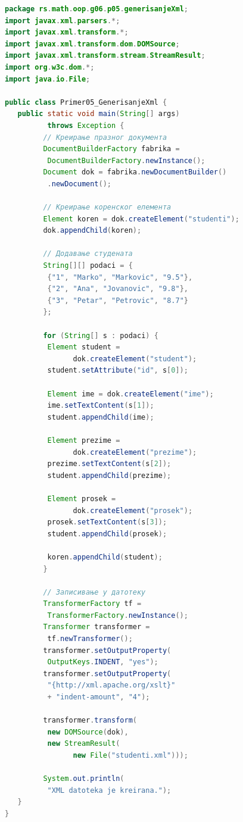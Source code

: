\begin{lstlisting}[language=Java]
package rs.math.oop.g06.p05.generisanjeXml;
import javax.xml.parsers.*;
import javax.xml.transform.*;
import javax.xml.transform.dom.DOMSource;
import javax.xml.transform.stream.StreamResult;
import org.w3c.dom.*;
import java.io.File;
 
public class Primer05_GenerisanjeXml {
   public static void main(String[] args)
          throws Exception {
         // Креирање празног документа
         DocumentBuilderFactory fabrika =
          DocumentBuilderFactory.newInstance();
         Document dok = fabrika.newDocumentBuilder()
          .newDocument();
 
         // Креирање коренског елемента
         Element koren = dok.createElement("studenti");
         dok.appendChild(koren);
 
         // Додавање студената
         String[][] podaci = {
          {"1", "Marko", "Markovic", "9.5"},
          {"2", "Ana", "Jovanovic", "9.8"},
          {"3", "Petar", "Petrovic", "8.7"}
         };
 
         for (String[] s : podaci) {
          Element student =
                dok.createElement("student");
          student.setAttribute("id", s[0]);
 
          Element ime = dok.createElement("ime");
          ime.setTextContent(s[1]);
          student.appendChild(ime);
 
          Element prezime =
                dok.createElement("prezime");
          prezime.setTextContent(s[2]);
          student.appendChild(prezime);
 
          Element prosek =
                dok.createElement("prosek");
          prosek.setTextContent(s[3]);
          student.appendChild(prosek);
 
          koren.appendChild(student);
         }
 
         // Записивање у датотеку
         TransformerFactory tf =
          TransformerFactory.newInstance();
         Transformer transformer =
          tf.newTransformer();
         transformer.setOutputProperty(
          OutputKeys.INDENT, "yes");
         transformer.setOutputProperty(
          "{http://xml.apache.org/xslt}"
          + "indent-amount", "4");
 
         transformer.transform(
          new DOMSource(dok),
          new StreamResult(
                new File("studenti.xml")));
 
         System.out.println(
          "XML datoteka je kreirana.");
   }
}
\end{lstlisting}


